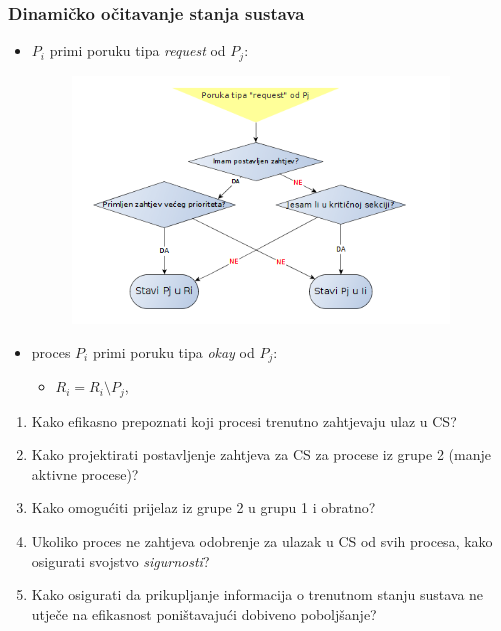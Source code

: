 \documentclass[11pt]{beamer}
\begin{document}
	\begin{frame}
		\frametitle{Dinamičko očitavanje stanja sustava}
		\begin{itemize}
			\item $P_i$ primi poruku tipa \textit{request} od $P_j$:
			\begin{figure}[h]
				\includegraphics[width=10cm]{proces1}
			\end{figure}
			\item proces $P_i$ primi poruku tipa \textit{okay} od $P_j$:
			\begin{itemize}
				\item $R_i = R_i \setminus P_j$,
			\end{itemize}
		\end{itemize}
	\end{frame}
\begin{frame}
	\begin{enumerate}
		\item Kako efikasno prepoznati koji procesi trenutno zahtjevaju ulaz u CS?
		\item Kako projektirati postavljenje zahtjeva za CS za procese iz grupe 2 (manje aktivne procese)?
		\item Kako omogućiti prijelaz iz grupe 2 u grupu 1 i obratno?
		\item Ukoliko proces ne zahtjeva odobrenje za ulazak u CS od svih procesa, kako osigurati svojstvo \textit{sigurnosti}? 
		\item Kako osigurati da prikupljanje informacija o trenutnom stanju sustava ne utječe na efikasnost poništavajući dobiveno poboljšanje?
	\end{enumerate}
\end{frame}
\end{document}
